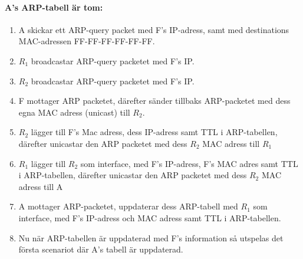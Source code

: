 \paragraph{A's ARP-tabell är tom:}
\begin{enumerate}
    \item A skickar ett ARP-query packet med F's IP-adress, samt med destinations
	MAC-adressen FF-FF-FF-FF-FF-FF.
    \item $R_1$ broadcastar ARP-query packetet med F's IP.
    \item $R_2$ broadcastar ARP-query packetet med F's IP.
    \item  F mottager ARP packetet, därefter sänder tillbaks ARP-packetet med dess egna MAC
	adress (unicast) till $R_2$.
    \item $R_2$ lägger till F's Mac adress, dess IP-adress samt TTL i ARP-tabellen, därefter unicastar den
	ARP packetet med dess $R_2$ MAC adress till $R_1$

    \item $R_1$ lägger till $R_2$ som interface, med F's IP-adress, F's MAC adres samt TTL i ARP-tabellen, därefter unicastar den
	ARP packetet med dess $R_2$ MAC adress till A
    \item A mottager ARP-packetet, uppdaterar dess ARP-tabell med $R_1$ som interface, med F's
	IP-adress och MAC adress samt TTL i ARP-tabellen.

    \item Nu när ARP-tabellen är uppdaterad med F's information så utspelas det första scenariot där A's tabell är uppdaterad.
\end{enumerate}

